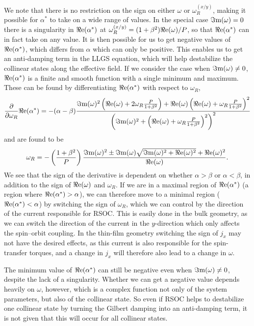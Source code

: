 We note that there is no restriction on the sign on either $\omega$ or $\omega_R^{(x/y)}$, making it possible for $\alpha^*$ to take on a wide range of values. In the special case ${\Im\mathrm{m}}(\omega)=0$ there is a singularity in ${\Re\mathrm{e}}(\alpha^*)$ at $\omega_R^{(x/y)}=(1+\beta^2){\Re\mathrm{e}}(\omega)/P$, so that ${\Re\mathrm{e}}(\alpha^*)$ can in fact take on any value. It is then possible for us to get negative values of ${\Re\mathrm{e}}(\alpha^*)$, which differs from $\alpha$ which can only be positive. This enables us to get an anti-damping term in the LLGS equation, which will help destabilize the collinear states along the effective field. If we consider the case when ${\Im\mathrm{m}}(\omega)\neq0$, ${\Re\mathrm{e}}(\alpha^*)$ is a finite and smooth function with a single minimum and maximum. These can be found by differentiating ${\Re\mathrm{e}}(\alpha^*)$ with respect to $\omega_R$, 
\begin{align}
    \frac{\partial}{\partial\omega_R} {\Re\mathrm{e}}(\alpha^*) = -(\alpha-\beta)\frac{{\Im\mathrm{m}}(\omega)^2\left({\Re\mathrm{e}}(\omega)+2\omega_R\frac{P}{1+\beta^2}\right) + {\Re\mathrm{e}}(\omega)\left({\Re\mathrm{e}}(\omega)+\omega_R\frac{P}{1+\beta^2}\right)^2}{\left({\Im\mathrm{m}}(\omega)^2+\left({\Re\mathrm{e}}(\omega)+\omega_R\frac{P}{1+\beta^2}\right)^2\right)^2}
\end{align}
and are found to be
\begin{align}
    \omega_R = -\left(\frac{1+\beta^2}{P}\right)\frac{{\Im\mathrm{m}}(\omega)^2\pm{\Im\mathrm{m}}(\omega)\sqrt{{\Im\mathrm{m}}(\omega)^2+{\Re\mathrm{e}}(\omega)^2}+{\Re\mathrm{e}}(\omega)^2}{{\Re\mathrm{e}}(\omega)}.
\end{align}
We see that the sign of the derivative is dependent on whether $\alpha>\beta$ or $\alpha<\beta$, in addition to the sign of ${\Re\mathrm{e}}(\omega)$ and $\omega_R$. If we are in a maximal region of ${\Re\mathrm{e}}(\alpha^*)$ (a region where ${\Re\mathrm{e}}(\alpha^*)>\alpha$), we can therefore move to a minimal region (${\Re\mathrm{e}}(\alpha^*)<\alpha$) by switching the sign of $\omega_R$, which we can control by the direction of the current responsible for RSOC. This is easily done in the bulk geometry, as we can switch the direction of the current in the $y$-direction which only affects the spin--orbit coupling. In the thin-film geometry switching the sign of $j_x$ may not have the desired effects, as this current is also responsible for the spin-transfer torques, and a change in $j_x$ will therefore also lead to a change in $\omega$.

The minimum value of ${\Re\mathrm{e}}(\alpha^*)$ can still be negative even when ${\Im\mathrm{m}}(\omega)\neq0$, despite the lack of a singularity. Whether we can get a negative value depends heavily on $\omega$, however, which is a complex function not only of the system parameters, but also of the collinear state. So even if RSOC helps to destabilize one collinear state by turning the Gilbert damping into an anti-damping term, it is not given that this will occur for all collinear states.

